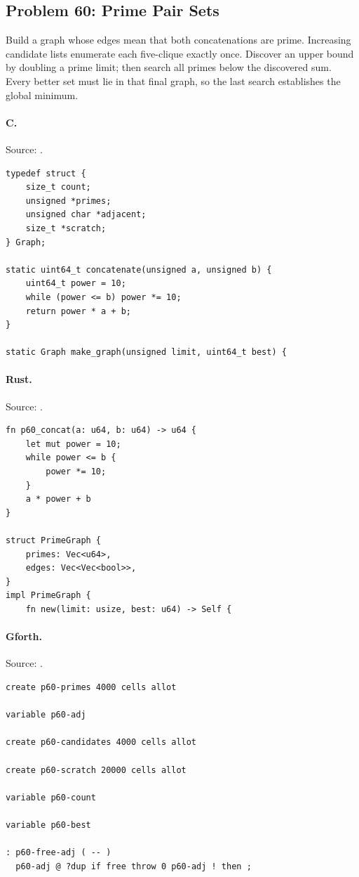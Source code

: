 \subsection{Problem 60: Prime Pair Sets}
\label{walkthrough:p60}
Build a graph whose edges mean that both concatenations are prime. Increasing candidate lists enumerate each five-clique exactly once. Discover an upper bound by doubling a prime limit; then search all primes below the discovered sum. Every better set must lie in that final graph, so the last search establishes the global minimum.

\paragraph{C.} Source: .
\begin{lstlisting}
typedef struct {
    size_t count;
    unsigned *primes;
    unsigned char *adjacent;
    size_t *scratch;
} Graph;

static uint64_t concatenate(unsigned a, unsigned b) {
    uint64_t power = 10;
    while (power <= b) power *= 10;
    return power * a + b;
}

static Graph make_graph(unsigned limit, uint64_t best) {
\end{lstlisting}

\paragraph{Rust.} Source: .
\begin{lstlisting}
fn p60_concat(a: u64, b: u64) -> u64 {
    let mut power = 10;
    while power <= b {
        power *= 10;
    }
    a * power + b
}

struct PrimeGraph {
    primes: Vec<u64>,
    edges: Vec<Vec<bool>>,
}
impl PrimeGraph {
    fn new(limit: usize, best: u64) -> Self {
\end{lstlisting}

\paragraph{Gforth.} Source: .
\begin{lstlisting}
create p60-primes 4000 cells allot

variable p60-adj

create p60-candidates 4000 cells allot

create p60-scratch 20000 cells allot

variable p60-count

variable p60-best

: p60-free-adj ( -- )
  p60-adj @ ?dup if free throw 0 p60-adj ! then ;
\end{lstlisting}

